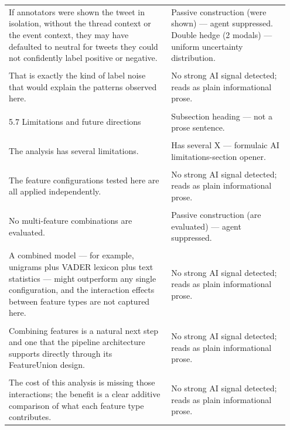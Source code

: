 \documentclass[11pt]{article}
\begin{document}
\begin{longtable}{|p{0.55\linewidth}|p{0.40\linewidth}|}
\hline
\rule{0pt}{3.5cm} & \\
\hline
If annotators were shown the tweet in isolation, without the thread context or the event context, they may have defaulted to neutral for tweets they could not confidently label positive or negative. & Passive construction (were shown) --- agent suppressed. Double hedge (2 modals) --- uniform uncertainty distribution. \\[2pt]
\hline
\rule{0pt}{3.5cm} & \\
\hline
That is exactly the kind of label noise that would explain the patterns observed here. & No strong AI signal detected; reads as plain informational prose. \\[2pt]
\hline
\rule{0pt}{3.5cm} & \\
\hline
5.7 Limitations and future directions & Subsection heading --- not a prose sentence. \\[2pt]
\hline
\rule{0pt}{3.5cm} & \\
\hline
The analysis has several limitations. & Has several X --- formulaic AI limitations-section opener. \\[2pt]
\hline
\rule{0pt}{3.5cm} & \\
\hline
The feature configurations tested here are all applied independently. & No strong AI signal detected; reads as plain informational prose. \\[2pt]
\hline
\rule{0pt}{3.5cm} & \\
\hline
No multi-feature combinations are evaluated. & Passive construction (are evaluated) --- agent suppressed. \\[2pt]
\hline
\rule{0pt}{3.5cm} & \\
\hline
A combined model --- for example, unigrams plus VADER lexicon plus text statistics --- might outperform any single configuration, and the interaction effects between feature types are not captured here. & No strong AI signal detected; reads as plain informational prose. \\[2pt]
\hline
\rule{0pt}{3.5cm} & \\
\hline
Combining features is a natural next step and one that the pipeline architecture supports directly through its FeatureUnion design. & No strong AI signal detected; reads as plain informational prose. \\[2pt]
\hline
\rule{0pt}{3.5cm} & \\
\hline
The cost of this analysis is missing those interactions; the benefit is a clear additive comparison of what each feature type contributes. & No strong AI signal detected; reads as plain informational prose. \\[2pt]

\end{longtable}
\end{document}
